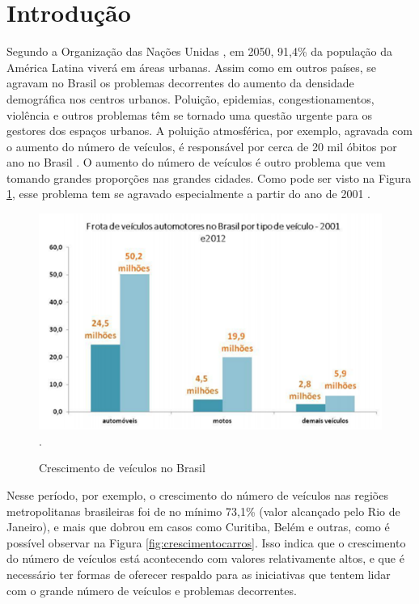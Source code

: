\chapter*{Introdução}

Segundo a Organização das Nações Unidas \cite{un2010state}, em 2050, 91,4\% da população da América Latina viverá em áreas urbanas. Assim como em outros países, se agravam no Brasil os problemas decorrentes do aumento da densidade demográfica nos centros urbanos. Poluição, epidemias, congestionamentos, violência e outros problemas têm se tornado uma questão urgente para os gestores dos espaços urbanos.  A poluição atmosférica, por exemplo, agravada com o aumento do número de veículos, é responsável por cerca de 20 mil óbitos por ano no Brasil \cite{arbex2012poluiccao}. O aumento do número de veículos é outro problema que vem tomando grandes proporções nas grandes cidades. Como pode ser visto na Figura \ref{fig:crescimentoveiculos}, esse problema tem se agravado especialmente a partir do ano de 2001 \cite{INCT2013evoluccao}.

\begin{figure}[ht]
\centering
\includegraphics[width=4.5in]{Imagens/carrosUp.png}. 
\caption{Crescimento de veículos no Brasil}
\label{fig:crescimentoveiculos}
\end{figure}

Nesse período, por exemplo, o crescimento do número de veículos nas regiões metropolitanas brasileiras foi de no mínimo 73,1\% (valor alcançado pelo Rio de Janeiro), e mais que dobrou em casos como Curitiba, Belém e outras, como é possível observar na Figura \ref{fig:crescimentocarros}. Isso indica que o crescimento do número de veículos está acontecendo com valores relativamente altos, e que é necessário ter formas de oferecer respaldo para as iniciativas que tentem lidar com o grande número de veículos e problemas decorrentes.

